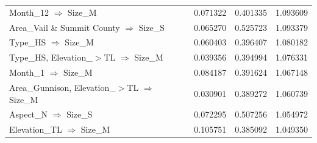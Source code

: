 \begin{tabular}{lrrr}
Month\_12 $\Rightarrow$ Size\_M & 0.071322 & 0.401335 & 1.093609 \\
Area\_Vail \& Summit County $\Rightarrow$ Size\_S & 0.065270 & 0.525723 & 1.093379 \\
Type\_HS $\Rightarrow$ Size\_M & 0.060403 & 0.396407 & 1.080182 \\
Type\_HS, Elevation\_$>$TL $\Rightarrow$ Size\_M & 0.039356 & 0.394994 & 1.076331 \\
Month\_1 $\Rightarrow$ Size\_M & 0.084187 & 0.391624 & 1.067148 \\
Area\_Gunnison, Elevation\_$>$TL $\Rightarrow$ Size\_M & 0.030901 & 0.389272 & 1.060739 \\
Aspect\_N $\Rightarrow$ Size\_S & 0.072295 & 0.507256 & 1.054972 \\
Elevation\_TL $\Rightarrow$ Size\_M & 0.105751 & 0.385092 & 1.049350 \\
\bottomrule
\end{tabular}
